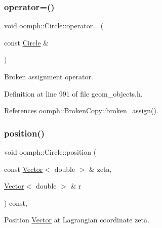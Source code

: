 \mbox{\label{classoomph_1_1Circle_a92312d03b16803f58f97842ce5923828}} 
\subsubsection{\texorpdfstring{operator=()}{operator=()}}
{\footnotesize\ttfamily void oomph\+::\+Circle\+::operator= (\begin{DoxyParamCaption}\item[{const \hyperlink{classoomph_1_1Circle}{Circle} \&}]{ }\end{DoxyParamCaption})\hspace{0.3cm}{\ttfamily [inline]}}



Broken assignment operator. 



Definition at line 991 of file geom\+\_\+objects.\+h.



References oomph\+::\+Broken\+Copy\+::broken\+\_\+assign().

\mbox{\label{classoomph_1_1Circle_a9a527de1361e8cb4c8445e3dd58e66f8}} 
\subsubsection{\texorpdfstring{position()}{position()}\hspace{0.1cm}{\footnotesize\ttfamily [1/2]}}
{\footnotesize\ttfamily void oomph\+::\+Circle\+::position (\begin{DoxyParamCaption}\item[{const \hyperlink{classoomph_1_1Vector}{Vector}$<$ double $>$ \&}]{zeta,  }\item[{\hyperlink{classoomph_1_1Vector}{Vector}$<$ double $>$ \&}]{r }\end{DoxyParamCaption}) const\hspace{0.3cm}{\ttfamily [inline]}, {\ttfamily [virtual]}}



Position \hyperlink{classoomph_1_1Vector}{Vector} at Lagrangian coordinate zeta. 



